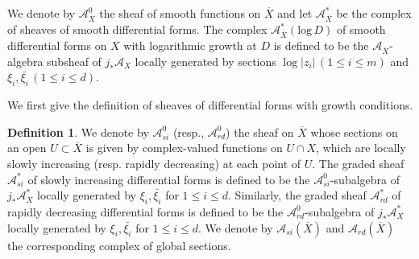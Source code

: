 \documentclass[11pt, a4paper]{amsart}
\theoremstyle{plain}
\theoremstyle{definition}
\newtheorem{definition}[theorem]{Definition}
\numberwithin{equation}{section}
\begin{document}
\par We denote by $\mathcal{A}_{\overline{X}}^{0}$ the sheaf of smooth functions on $\overline{X}$ and let $\mathcal{A}^{*}_{\overline{X}}$ be the complex of sheaves of smooth differential forms. The complex $\mathcal{A}^{*}_{\overline{X}}(\mathrm{log}\, D)$ of smooth differential forms on $X$ with logarithmic growth at $D$ is defined to be the $\mathcal{A}_{\overline{X}}$-algebra subsheaf of $j_{*} \mathcal{A}_{X}$ locally generated by sections $\log|z_{i}|\, (1 \le i \le m)$ and $\xi_{i}, \bar{\xi_{i}} \, (1 \le i \le d)$. \cite[\S 2]{Burgos94} 

\par We first give the definition of sheaves of differential forms with growth conditions. 
\begin{definition}
    We denote by $\mathcal{A}_{si}^{0}$ (resp., $\mathcal{A}_{rd}^{0}$) the sheaf on $\overline{X}$ whose sections on an open $U \subset \overline{X}$ is given by complex-valued functions on $U \cap X$, which are locally slowly increasing (resp. rapidly decreasing) \cite[Definition 2.3]{BCLRJ24} at each point of $U$. The graded sheaf $\mathcal{A}_{si}^{*}$ of slowly increasing differential forms is defined to be the $\mathcal{A}_{si}^{0}$-subalgebra of $j_{*} \mathcal{A}_{X}^{*}$ locally generated by $\xi_{i}, \bar{\xi_{i}}$ for $1 \le i \le d$.  Similarly, the graded sheaf $\mathcal{A}_{rd}^{*}$ of rapidly decreasing differential forms is defined to be the $\mathcal{A}_{rd}^{0}$-subalgebra of $j_{*}\mathcal{A}_{X}^{*}$ locally generated by $\xi_{i}, \bar{\xi_{i}}$ for $1 \le i \le d$. We denote by $\mathcal{A}_{si}(\overline{X})$ and $\mathcal{A}_{rd}(\overline{X})$ the corresponding complex of global sections. 
\end{definition}
\end{document}
